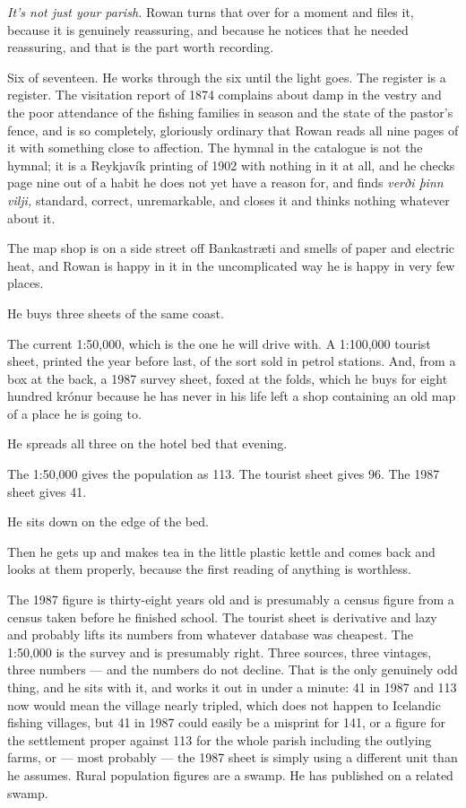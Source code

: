 \documentclass[11pt,oneside]{book}
\newcommand{\sceneline}{%
  \par\vspace{1.2em}
  \begin{center}
    \fontsize{11}{11}\selectfont \textbullet\quad\textbullet\quad\textbullet
  \end{center}
  \vspace{0.6em}\noindent\ignorespaces
}
\begin{document}
\emph{It's not just your parish.} Rowan turns that over for a moment and
files it, because it is genuinely reassuring, and because he notices
that he needed reassuring, and that is the part worth recording.

Six of seventeen. He works through the six until the light goes. The
register is a register. The visitation report of 1874 complains about
damp in the vestry and the poor attendance of the fishing families in
season and the state of the pastor's fence, and is so completely,
gloriously ordinary that Rowan reads all nine pages of it with something
close to affection. The hymnal in the catalogue is not the hymnal;
it is a Reykjavík printing of 1902 with nothing in it at all, and he
checks page nine out of a habit he does not yet have a reason for, and
finds \emph{verði þinn vilji,} standard, correct, unremarkable, and
closes it and thinks nothing whatever about it.

\sceneline

The map shop is on a side street off Bankastræti and smells of paper and
electric heat, and Rowan is happy in it in the uncomplicated way he is
happy in very few places.

He buys three sheets of the same coast.

The current 1:50,000, which is the one he will drive with. A 1:100,000
tourist sheet, printed the year before last, of the sort sold in petrol
stations. And, from a box at the back, a 1987 survey sheet, foxed at the
folds, which he buys for eight hundred krónur because he has never in
his life left a shop containing an old map of a place he is going to.

He spreads all three on the hotel bed that evening.

The 1:50,000 gives the population as 113. The tourist sheet gives 96.
The 1987 sheet gives 41.

He sits down on the edge of the bed.

Then he gets up and makes tea in the little plastic kettle and comes
back and looks at them properly, because the first reading of anything
is worthless.

The 1987 figure is thirty-eight years old and is presumably a census
figure from a census taken before he finished school. The tourist sheet
is derivative and lazy and probably lifts its numbers from whatever
database was cheapest. The 1:50,000 is the survey and is presumably
right. Three sources, three vintages, three numbers --- and the numbers
do not decline. That is the only genuinely odd thing, and he sits with
it, and works it out in under a minute: 41 in 1987 and 113 now would
mean the village nearly tripled, which does not happen to Icelandic
fishing villages, but 41 in 1987 could easily be a misprint for 141,
or a figure for the settlement proper against 113 for the whole
parish including the outlying farms, or --- most probably --- the
1987 sheet is simply using a different unit than he assumes. Rural
population figures are a swamp. He has published on a related swamp.
\end{document}
